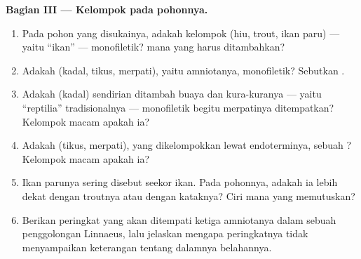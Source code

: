 \begin{problem}
\medskip
\noindent\textbf{Bagian III --- Kelompok pada pohonnya.}
\begin{enumerate}[resume]
  \item Pada pohon yang disukainya, adakah kelompok (hiu, trout, ikan
        paru) --- yaitu ``ikan'' --- monofiletik?  mana yang harus
        ditambahkan?
  \item Adakah (kadal, tikus, merpati), yaitu amniotanya, monofiletik?
        Sebutkan .
  \item Adakah (kadal) sendirian ditambah buaya dan kura-kuranya ---
        yaitu ``reptilia'' tradisionalnya --- monofiletik begitu
        merpatinya ditempatkan? Kelompok macam apakah ia?
  \item Adakah (tikus, merpati), yang dikelompokkan lewat endoterminya,
        sebuah ? Kelompok macam apakah ia?
  \item Ikan parunya sering disebut seekor ikan. Pada pohonnya, adakah
        ia lebih dekat dengan troutnya atau dengan kataknya? Ciri mana
        yang memutuskan?
  \item Berikan peringkat yang akan ditempati ketiga amniotanya dalam
        sebuah penggolongan Linnaeus, lalu jelaskan mengapa
        peringkatnya tidak menyampaikan keterangan tentang dalamnya
        belahannya.
\end{enumerate}


\end{problem}
